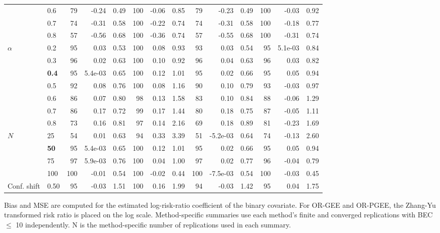 \begin{table}[htbp]
\begin{tabular}{ll|rrr|rrr|rrr|rrr}
 & 0.6 & 79 & -0.24 & 0.49 & 100 & -0.06 & 0.85 & 79 & -0.23 & 0.49 & 100 & -0.03 & 0.92 \\
 & 0.7 & 74 & -0.31 & 0.58 & 100 & -0.22 & 0.74 & 74 & -0.31 & 0.58 & 100 & -0.18 & 0.77 \\
 & 0.8 & 57 & -0.56 & 0.68 & 100 & -0.36 & 0.74 & 57 & -0.55 & 0.68 & 100 & -0.31 & 0.74 \\
\hline
$\alpha$ & 0.2 & 95 & 0.03 & 0.53 & 100 & 0.08 & 0.93 & 93 & 0.03 & 0.54 & 95 & 5.1e-03 & 0.84 \\
 & 0.3 & 96 & 0.02 & 0.63 & 100 & 0.10 & 0.92 & 96 & 0.04 & 0.63 & 96 & 0.03 & 0.82 \\
 & \textbf{0.4} & 95 & 5.4e-03 & 0.65 & 100 & 0.12 & 1.01 & 95 & 0.02 & 0.66 & 95 & 0.05 & 0.94 \\
 & 0.5 & 92 & 0.08 & 0.76 & 100 & 0.08 & 1.16 & 90 & 0.10 & 0.79 & 93 & -0.03 & 0.97 \\
 & 0.6 & 86 & 0.07 & 0.80 & 98 & 0.13 & 1.58 & 83 & 0.10 & 0.84 & 88 & -0.06 & 1.29 \\
 & 0.7 & 86 & 0.17 & 0.72 & 99 & 0.17 & 1.44 & 80 & 0.18 & 0.75 & 87 & -0.05 & 1.11 \\
 & 0.8 & 73 & 0.16 & 0.81 & 97 & 0.14 & 2.16 & 69 & 0.18 & 0.89 & 81 & -0.23 & 1.69 \\
\hline
$N$ & 25 & 54 & 0.01 & 0.63 & 94 & 0.33 & 3.39 & 51 & -5.2e-03 & 0.64 & 74 & -0.13 & 2.60 \\
 & \textbf{50} & 95 & 5.4e-03 & 0.65 & 100 & 0.12 & 1.01 & 95 & 0.02 & 0.66 & 95 & 0.05 & 0.94 \\
 & 75 & 97 & 5.9e-03 & 0.76 & 100 & 0.04 & 1.00 & 97 & 0.02 & 0.77 & 96 & -0.04 & 0.79 \\
 & 100 & 100 & -0.01 & 0.54 & 100 & -0.02 & 0.44 & 100 & -7.5e-03 & 0.54 & 100 & -0.03 & 0.45 \\
\hline
Conf. shift & 0.50 & 95 & -0.03 & 1.51 & 100 & 0.16 & 1.99 & 94 & -0.03 & 1.42 & 95 & 0.04 & 1.75 \\
\hline
\end{tabular}
\begin{flushleft}
\footnotesize Bias and MSE are computed for the estimated log-risk-ratio coefficient of the binary covariate. For OR-GEE and OR-PGEE, the Zhang-Yu transformed risk ratio is placed on the log scale. Method-specific summaries use each method's finite and converged replications with BEC $\leq$ 10 independently. N is the method-specific number of replications used in each summary.
\end{flushleft}
\end{table}
